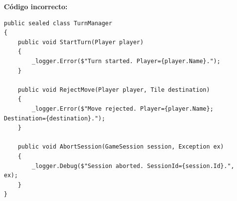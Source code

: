 \textbf{Código incorrecto:}
\begin{lstlisting}[style=csharpstyle]
public sealed class TurnManager
{
    public void StartTurn(Player player)
    {
        _logger.Error($"Turn started. Player={player.Name}.");
    }

    public void RejectMove(Player player, Tile destination)
    {
        _logger.Error($"Move rejected. Player={player.Name}; Destination={destination}.");
    }

    public void AbortSession(GameSession session, Exception ex)
    {
        _logger.Debug($"Session aborted. SessionId={session.Id}.", ex);
    }
}
\end{lstlisting}
